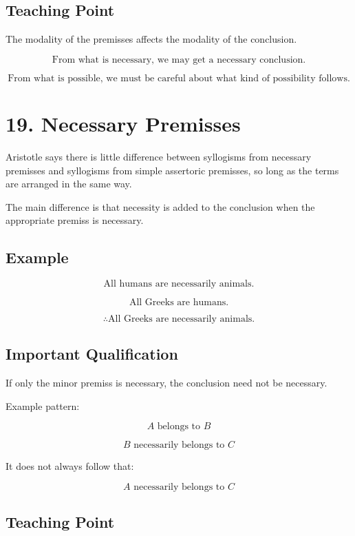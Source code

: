 \documentclass[12pt]{article}
\begin{document}
\subsection*{Teaching Point}

The modality of the premisses affects the modality of the conclusion.

\[
\boxed{
\text{From what is necessary, we may get a necessary conclusion.}
}
\]

\[
\boxed{
\text{From what is possible, we must be careful about what kind of possibility follows.}
}
\]

\section*{19. Necessary Premisses}

Aristotle says there is little difference between syllogisms from necessary
premisses and syllogisms from simple assertoric premisses, so long as the terms
are arranged in the same way.

The main difference is that necessity is added to the conclusion when the
appropriate premiss is necessary.

\subsection*{Example}

\[
\text{All humans are necessarily animals.}
\]

\[
\text{All Greeks are humans.}
\]

\[
\therefore \text{All Greeks are necessarily animals.}
\]

\subsection*{Important Qualification}

If only the minor premiss is necessary, the conclusion need not be necessary.

Example pattern:

\[
A \text{ belongs to } B
\]

\[
B \text{ necessarily belongs to } C
\]

It does not always follow that:

\[
A \text{ necessarily belongs to } C
\]

\subsection*{Teaching Point}
\end{document}
